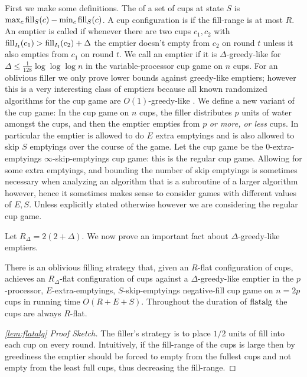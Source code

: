 First we make some definitions. The  of a set of
cups at state $S$ is $\max_c \operatorname{\text{\textup{fill}}}_S(c) - \min_c \operatorname{\text{\textup{fill}}}_S(c)$. A cup
configuration is  if the fill-range is at most
$R$. An emptier is called  if whenever
there are two cups $c_1, c_2$ with $\operatorname{\text{\textup{fill}}}_{I_t}(c_1) >
\operatorname{\text{\textup{fill}}}_{I_t}(c_2) + \Delta$ the emptier doesn't empty from $c_2$ on
round $t$ unless it also empties from $c_1$ on round $t$. 
We call an emptier  if it is
$\Delta$-greedy-like for $\Delta \le \frac{1}{128}\log\log\log n$
in the variable-processor cup game on $n$ cups.
For an oblivious filler we only prove lower bounds against
greedy-like emptiers; however this is a very interesting
class of emptiers because all known randomized algorithms for the
cup game are $O(1)$-greedy-like \cite{BenderFaKu19, Kuszmaul20}. We define a
new variant of the cup game: In the 
 cup game on $n$ cups, the filler
distributes $p$ units of water amongst the cups, and then the
emptier empties from $p$ \textit{or more, or less} cups. In
particular the emptier is allowed to do $E$ extra emptyings and
is also allowed to skip $S$ emptyings over the course of the
game. Let the  cup game be the $0$-extra-emptyings
$\infty$-skip-emptyings cup game: this is the regular cup game.
Allowing for some extra emptyings, and bounding the number of
skip emptyings is sometimes necessary when analyzing an algorithm
that is a subroutine of a larger algorithm however, hence it
sometimes makes sense to consider games with different values of
$E,S$. Unless explicitly stated otherwise however we are
considering the regular cup game.

Let $R_\Delta = 2(2+\Delta)$.
We now prove an important fact about $\Delta$-greedy-like emptiers.
\begin{lemma}
  \label{lem:TO_flatalg}
  There is an oblivious filling strategy  that,
  given an $R$-flat configuration of cups, achieves an
  $R_\Delta$-flat configuration of cups against a
  $\Delta$-greedy-like emptier in the $p$-processor,
  $E$-extra-emptyings, $S$-skip-emptyings negative-fill cup game
  on $n=2p$ cups in running time $O(R+E+S)$. Throughout the
  duration of $\operatorname{\text{\textup{flatalg}}}$ the cups are always $R$-flat.
\end{lemma}
\begin{proof}[\cref{lem:flatalg} Proof Sketch]
  The filler's strategy is to place $1/2$ units of fill into each
  cup on every round.
  Intuitively, if the fill-range of the cups is large then by
  greediness the emptier should be forced to empty from the
  fullest cups and not empty from the least full cups, thus
  decreasing the fill-range.
\end{proof}

